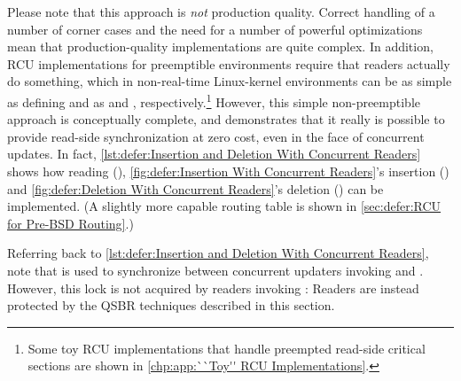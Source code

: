 Please note that this approach is \emph{not} production quality.
Correct handling of a number of corner cases and the need for a number
of powerful optimizations mean that production-quality implementations
are quite complex.
In addition, RCU implementations for preemptible environments
require that readers actually do something, which in non-real-time
Linux-kernel environments can be as simple as defining
 and  as 
and , respectively.\footnote{
	Some toy RCU implementations that handle preempted
	read-side critical sections are shown in
	\cref{chp:app:``Toy'' RCU Implementations}\@.}
However, this simple non-preemptible approach is conceptually complete,
and demonstrates that it really is possible to provide read-side
synchronization at zero cost, even in the face of concurrent updates.
In fact,
\cref{lst:defer:Insertion and Deletion With Concurrent Readers}
shows how reading (),
\cref{fig:defer:Insertion With Concurrent Readers}'s
insertion () and
\cref{fig:defer:Deletion With Concurrent Readers}'s
deletion () can
be implemented.
(A slightly more capable routing table is shown in
\cref{sec:defer:RCU for Pre-BSD Routing}.)


Referring back to
\cref{lst:defer:Insertion and Deletion With Concurrent Readers},
note that  is used to synchronize between concurrent updaters
invoking  and .
However, this lock is not acquired by readers invoking :
Readers are instead protected by the QSBR techniques described in this section.

